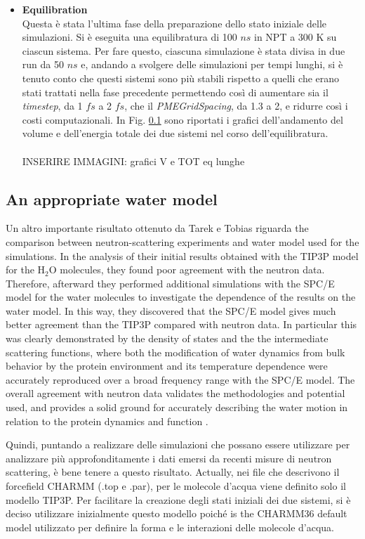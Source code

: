 \begin{itemize}
\item \textbf{Equilibration}\\
Questa è stata l'ultima fase della preparazione dello stato iniziale delle simulazioni. Si è eseguita una equilibratura di 100 $ns$ in NPT a 300 K su ciascun sistema. Per fare questo, ciascuna simulazione è stata divisa in due run da 50 $ns$ e, andando a svolgere delle simulazioni per tempi lunghi, si è tenuto conto che questi sistemi sono più stabili rispetto a quelli che erano stati trattati nella fase precedente permettendo così di aumentare sia il \textit{timestep}, da 1 $fs$ a 2 $fs$, che il \textit{PMEGridSpacing}, da 1.3 a 2, e ridurre così i costi computazionali. In Fig. \ref{} sono riportati i grafici dell'andamento del volume e dell'energia totale dei due sistemi nel corso dell'equilibratura.\\ 
\\
INSERIRE IMMAGINI: grafici V e TOT eq lunghe\\
\end{itemize} 

\subsection{An appropriate water model}
Un altro importante risultato ottenuto da Tarek e Tobias riguarda the comparison between neutron-scattering experiments and water model used for the simulations.
In the analysis of their initial results obtained with the TIP3P model \cite{jorgensen1983comparison} for the H$_2$O molecules, they found poor agreement with the neutron data. Therefore, afterward they performed additional simulations with the SPC/E \cite{berendsen1987missing} model for the water molecules to investigate the dependence of the results on the water model. In this way, they discovered that the SPC/E model gives much better agreement than the TIP3P compared with neutron data.  
In particular this was clearly demonstrated by the density of states and the  the intermediate scattering functions, where both the modification of water dynamics from bulk behavior by the protein environment and its temperature dependence were accurately reproduced over a broad frequency range with the SPC/E model. The overall agreement with neutron data validates the methodologies and potential used, and provides a solid ground for accurately describing the water motion in relation to the protein dynamics and function  \cite{tarek2000dynamics}.

Quindi, puntando a realizzare delle simulazioni che possano essere utilizzare per analizzare più approfonditamente i dati emersi da recenti misure di neutron scattering, è bene tenere a questo risultato. Actually, nei file che descrivono il forcefield CHARMM (.top e .par), per le molecole d'acqua viene definito solo il modello TIP3P. Per facilitare la creazione degli stati iniziali dei due sistemi, si è deciso utilizzare inizialmente questo modello poiché is the CHARMM36 default model utilizzato per definire la forma e le interazioni delle molecole d'acqua. 

